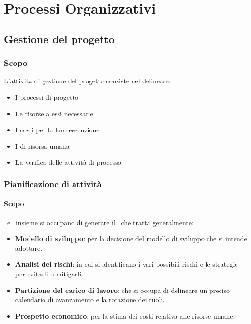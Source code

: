 \section{Processi Organizzativi}


    \subsection{Gestione del progetto}

	    \subsubsection{Scopo}
	    L'attività di gestione del progetto consiste nel delineare:
	    \begin{itemize}
	    	\item I processi di progetto
	    	\item Le risorse a essi necessarie 
	    	\item I costi per la loro esecuzione
	    	\item I  di risorsa umana
	    	\item La verifica delle attività di processo
	    \end{itemize}


		\subsubsection{Pianificazione di attività}

			\paragraph{Scopo}
			\Res\ e \Amm\ insieme si occupano di generare il \PdPv\ che tratta generalmente:
			\begin{itemize}
				\item \textbf{Modello di sviluppo}: per la decisione del modello di sviluppo che si intende adottare.
				\item \textbf{Analisi dei rischi}: in cui si identificano i vari possibili rischi e le strategie per evitarli o mitigarli.   
				\item \textbf{Partizione del carico di lavoro}: che si occupa di delineare un preciso calendario di avanzamento e la rotazione dei ruoli.
				\item \textbf{Prospetto economico}: per la stima dei costi relativa alle risorse umane.
			\end{itemize}

